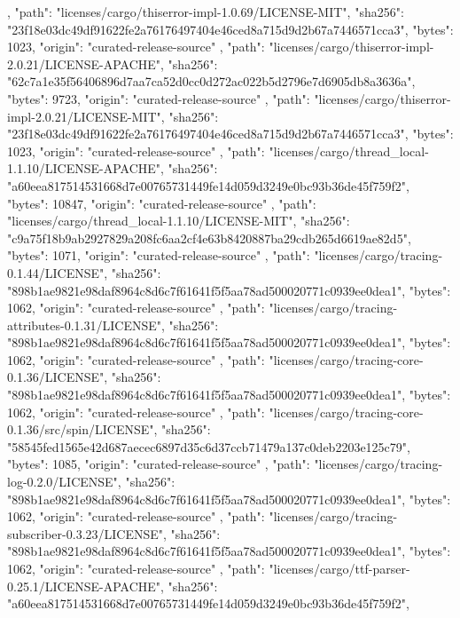 {{    },
    {
      "path": "licenses/cargo/thiserror-impl-1.0.69/LICENSE-MIT",
      "sha256": "23f18e03dc49df91622fe2a76176497404e46ced8a715d9d2b67a7446571cca3",
      "bytes": 1023,
      "origin": "curated-release-source"
    },
    {
      "path": "licenses/cargo/thiserror-impl-2.0.21/LICENSE-APACHE",
      "sha256": "62c7a1e35f56406896d7aa7ca52d0cc0d272ac022b5d2796e7d6905db8a3636a",
      "bytes": 9723,
      "origin": "curated-release-source"
    },
    {
      "path": "licenses/cargo/thiserror-impl-2.0.21/LICENSE-MIT",
      "sha256": "23f18e03dc49df91622fe2a76176497404e46ced8a715d9d2b67a7446571cca3",
      "bytes": 1023,
      "origin": "curated-release-source"
    },
    {
      "path": "licenses/cargo/thread_local-1.1.10/LICENSE-APACHE",
      "sha256": "a60eea817514531668d7e00765731449fe14d059d3249e0bc93b36de45f759f2",
      "bytes": 10847,
      "origin": "curated-release-source"
    },
    {
      "path": "licenses/cargo/thread_local-1.1.10/LICENSE-MIT",
      "sha256": "c9a75f18b9ab2927829a208fc6aa2cf4e63b8420887ba29cdb265d6619ae82d5",
      "bytes": 1071,
      "origin": "curated-release-source"
    },
    {
      "path": "licenses/cargo/tracing-0.1.44/LICENSE",
      "sha256": "898b1ae9821e98daf8964c8d6c7f61641f5f5aa78ad500020771c0939ee0dea1",
      "bytes": 1062,
      "origin": "curated-release-source"
    },
    {
      "path": "licenses/cargo/tracing-attributes-0.1.31/LICENSE",
      "sha256": "898b1ae9821e98daf8964c8d6c7f61641f5f5aa78ad500020771c0939ee0dea1",
      "bytes": 1062,
      "origin": "curated-release-source"
    },
    {
      "path": "licenses/cargo/tracing-core-0.1.36/LICENSE",
      "sha256": "898b1ae9821e98daf8964c8d6c7f61641f5f5aa78ad500020771c0939ee0dea1",
      "bytes": 1062,
      "origin": "curated-release-source"
    },
    {
      "path": "licenses/cargo/tracing-core-0.1.36/src/spin/LICENSE",
      "sha256": "58545fed1565e42d687aecec6897d35c6d37ccb71479a137c0deb2203e125c79",
      "bytes": 1085,
      "origin": "curated-release-source"
    },
    {
      "path": "licenses/cargo/tracing-log-0.2.0/LICENSE",
      "sha256": "898b1ae9821e98daf8964c8d6c7f61641f5f5aa78ad500020771c0939ee0dea1",
      "bytes": 1062,
      "origin": "curated-release-source"
    },
    {
      "path": "licenses/cargo/tracing-subscriber-0.3.23/LICENSE",
      "sha256": "898b1ae9821e98daf8964c8d6c7f61641f5f5aa78ad500020771c0939ee0dea1",
      "bytes": 1062,
      "origin": "curated-release-source"
    },
    {
      "path": "licenses/cargo/ttf-parser-0.25.1/LICENSE-APACHE",
      "sha256": "a60eea817514531668d7e00765731449fe14d059d3249e0bc93b36de45f759f2",
}}
